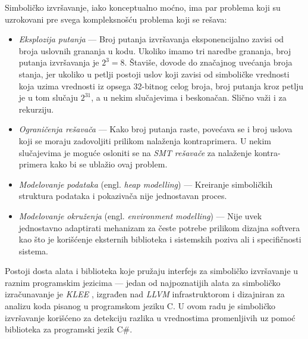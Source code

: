 Simboličko izvršavanje, iako konceptualno moćno, ima par problema koji su uzrokovani pre svega kompleksnošću problema koji se rešava:
\begin{itemize}
    \item \emph{Eksplozija putanja} --- Broj putanja izvršavanja eksponencijalno zavisi od broja uslovnih grananja u kodu. Ukoliko imamo tri naredbe grananja, broj putanja izvršavanja je $2^3=8$. Štaviše, dovode do značajnog uvećanja broja stanja, jer ukoliko u petlji postoji uslov koji zavisi od simboličke vrednosti koja uzima vrednosti iz opsega 32-bitnog celog broja, broj putanja kroz petlju je u tom slučaju $2^{31}$, a u nekim slučajevima i beskonačan. Slično važi i za rekurziju.
    \item \emph{Ograničenja rešavača} --- Kako broj putanja raste, povećava se i broj uslova koji se moraju zadovoljiti prilikom nalaženja kontraprimera. U nekim slučajevima je moguće osloniti se na \emph{SMT rešavače} \cite{SMT} za nalaženje kontra-primera kako bi se ublažio ovaj problem.
    \item \emph{Modelovanje podataka} (engl. \emph{heap modelling}) --- Kreiranje simboličkih struktura podataka i pokazivača nije jednostavan proces.
    \item \emph{Modelovanje okruženja} (engl. \emph{environment modelling}) --- Nije uvek jednostavno adaptirati mehanizam za česte potrebe prilikom dizajna softvera kao što je korišćenje eksternih biblioteka i sistemskih poziva ali i specifičnosti sistema.
\end{itemize}

Postoji dosta alata i biblioteka koje pružaju interfejs za simboličko izvršavanje u raznim programskim jezicima --- jedan od najpoznatijih alata za simboličko izračunavanje je \emph{KLEE} \cite{KLEE}, izgrađen nad \emph{LLVM} infrastruktorom \cite{LLVM} \cite{LLVM04} i dizajniran za analizu koda pisanog u programskom jeziku C. U ovom radu je simboličko izvršavanje korišćeno za detekciju razlika u vrednostima promenljivih uz pomoć biblioteka za programski jezik C\#.
